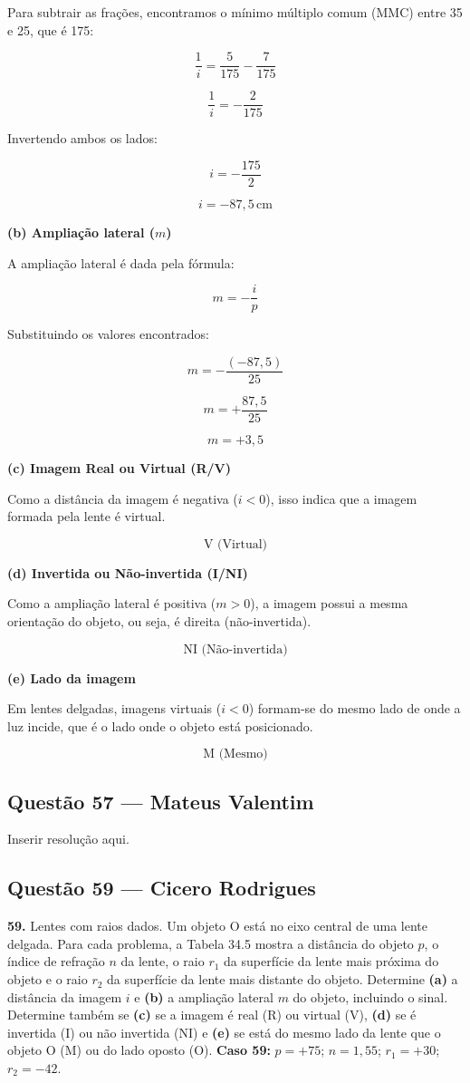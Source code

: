 \documentclass[12pt,a4paper]{article}
\begin{document}
Para subtrair as frações, encontramos o mínimo múltiplo comum (MMC) entre 35 e 25, que é 175:

\[
\frac{1}{i} = \frac{5}{175} - \frac{7}{175}
\]

\[
\frac{1}{i} = -\frac{2}{175}
\]

Invertendo ambos os lados:

\[
i = -\frac{175}{2}
\]

\[
\boxed{i = -87,5\,\text{cm}}
\]

\textbf{(b) Ampliação lateral (\(m\))}

A ampliação lateral é dada pela fórmula:

\[
m = -\frac{i}{p}
\]

Substituindo os valores encontrados:

\[
m = -\frac{(-87,5)}{25}
\]

\[
m = +\frac{87,5}{25}
\]

\[
\boxed{m = +3,5}
\]

\textbf{(c) Imagem Real ou Virtual (R/V)}

Como a distância da imagem é negativa (\(i < 0\)), isso indica que a imagem formada pela lente é virtual.

\[
\boxed{\text{V (Virtual)}}
\]

\textbf{(d) Invertida ou Não-invertida (I/NI)}

Como a ampliação lateral é positiva (\(m > 0\)), a imagem possui a mesma orientação do objeto, ou seja, é direita (não-invertida).

\[
\boxed{\text{NI (Não-invertida)}}
\]

\textbf{(e) Lado da imagem}

Em lentes delgadas, imagens virtuais (\(i < 0\)) formam-se do mesmo lado de onde a luz incide, que é o lado onde o objeto está posicionado.

\[
\boxed{\text{M (Mesmo)}}
\]

\subsection{Questão 57 — Mateus Valentim}
Inserir resolução aqui.

\subsection{Questão 59 — Cicero Rodrigues}

\textbf{59. }\normalfont Lentes com raios dados. Um objeto O está no eixo central de uma lente delgada. Para cada problema, a Tabela 34.5 mostra a distância do objeto $p$, o índice de refração $n$ da lente, o raio $r_1$ da superfície da lente mais próxima do objeto e o raio $r_2$ da superfície da lente mais distante do objeto. Determine \textbf{(a)} a distância da imagem $i$ e \textbf{(b)} a ampliação lateral $m$ do objeto, incluindo o sinal. Determine também se \textbf{(c)} se a imagem é real (R) ou virtual (V), \textbf{(d)} se é invertida (I) ou não invertida (NI) e \textbf{(e)} se está do mesmo lado da lente que o objeto O (M) ou do lado oposto (O). \textbf{Caso 59:} $p = +75$; $n = 1,55$; $r_1 = +30$; $r_2 = -42$.
\end{document}
